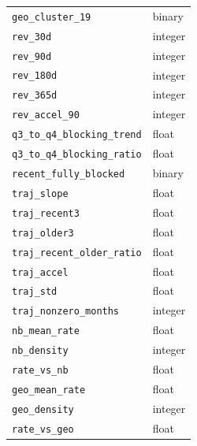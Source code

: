 \documentclass[journal]{IEEEtran}
\begin{document}
\begin{longtable}{p{2.2in}p{0.8in}}
\texttt{geo\_cluster\_19} & binary \\
\texttt{rev\_30d} & integer \\
\texttt{rev\_90d} & integer \\
\texttt{rev\_180d} & integer \\
\texttt{rev\_365d} & integer \\
\texttt{rev\_accel\_90} & integer \\
\texttt{q3\_to\_q4\_blocking\_trend} & float \\
\texttt{q3\_to\_q4\_blocking\_ratio} & float \\
\texttt{recent\_fully\_blocked} & binary \\
\texttt{traj\_slope} & float \\
\texttt{traj\_recent3} & float \\
\texttt{traj\_older3} & float \\
\texttt{traj\_recent\_older\_ratio} & float \\
\texttt{traj\_accel} & float \\
\texttt{traj\_std} & float \\
\texttt{traj\_nonzero\_months} & integer \\
\texttt{nb\_mean\_rate} & float \\
\texttt{nb\_density} & integer \\
\texttt{rate\_vs\_nb} & float \\
\texttt{geo\_mean\_rate} & float \\
\texttt{geo\_density} & integer \\
\texttt{rate\_vs\_geo} & float \\
\end{longtable}
\end{document}
